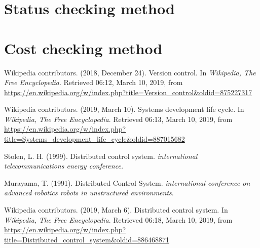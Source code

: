 \documentclass[a4paper]{report}
\begin{document}
\section{Status checking method}



\section{Cost checking method}



\begin{thebibliography}{A}

Wikipedia contributors. (2018, December 24). Version control. In \emph{Wikipedia, The Free Encyclopedia}. Retrieved 06:12, March 10, 2019, from \url{https://en.wikipedia.org/w/index.php?title=Version_control&oldid=875227317}

Wikipedia contributors. (2019, March 10). Systems development life cycle. In \emph{Wikipedia, The Free Encyclopedia}. Retrieved 06:13, March 10, 2019, from \url{https://en.wikipedia.org/w/index.php?title=Systems_development_life_cycle&oldid=887015682}

Stolen, L. H. (1999). Distributed control system. \emph{international telecommunications energy conference.}

Murayama, T. (1991). Distributed Control System. \emph{international conference on advanced robotics robots in unstructured environments}.

Wikipedia contributors. (2019, March 6). Distributed control system. In \emph{Wikipedia, The Free Encyclopedia}. Retrieved 06:18, March 10, 2019, from \url{https://en.wikipedia.org/w/index.php?title=Distributed_control_system&oldid=886468871}

\end{thebibliography}
\end{document}
